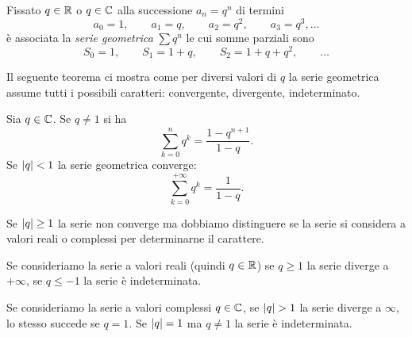 \begin{example}
Fissato $q \in {\mathbb R}$ o $q\in {\mathbb C}$ alla successione
$  a_n = q^n$
di termini
\[
  a_0 = 1,\qquad
  a_1 = q,\qquad
  a_2 = q^2,\qquad
  a_3 = q^3, \dots
\]
è associata la
\emph{serie geometrica}%
%
$\sum q^n$
le cui somme parziali sono
\[
  S_0 = 1, \qquad
  S_1 = 1 + q, \qquad
  S_2 = 1 + q + q^2, \qquad
  \dots
\]
\end{example}

Il seguente teorema ci mostra come per diversi valori di $q$
la serie geometrica assume
tutti i possibili caratteri:
convergente, divergente, indeterminato.

\begin{theorem}
\mymark{***}
Sia $q\in {\mathbb C}$. Se $q\neq 1$ si ha
\[
 \sum_{k=0}^n q^k  = \frac{1-q^{n+1}\!\!\!\!\!\!}{1-q}.
\]
Se ${\left|q\right|} < 1$ la serie geometrica converge:
\[
 \sum_{k=0}^{+\infty} q^k = \frac{1}{1-q}.
\]

Se ${\left|q\right|}\ge 1$ la serie non converge
ma dobbiamo distinguere se la serie
si considera a valori reali o complessi
per determinarne il carattere.

Se consideriamo la serie a valori reali
(quindi $q\in {\mathbb R}$) se $q\ge 1$ la serie
diverge a $+\infty$,
se $q\le -1$ la serie è indeterminata.

Se consideriamo la serie a valori complessi
$q\in {\mathbb C}$, se ${\left|q\right|}>1$ la serie diverge
a $\infty$, lo stesso succede se $q=1$.
Se ${\left|q\right|}=1$ ma $q\neq 1$ la serie
è indeterminata.
\end{theorem}
%
